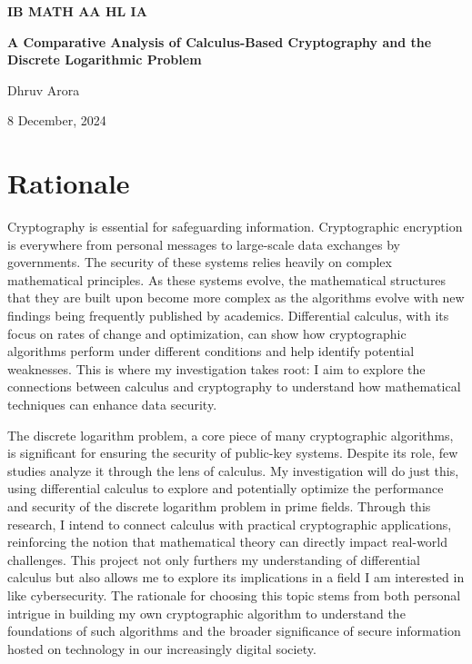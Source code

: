 \documentclass[12pt]{article}
\begin{document}
\begin{titlepage}
    \begin{center}
        \vspace*{1in}

        \textbf{IB MATH AA HL IA} \\

        \vspace{0.5in}

        \Large \textbf{A Comparative Analysis of Calculus-Based Cryptography and the Discrete Logarithmic Problem} \\

        \vspace{0.5in}

        \Large Dhruv Arora \\

        \vspace{0.25in}

        8 December, 2024

        \vspace{1.5in}
    \end{center}
\end{titlepage}

\newpage

\section{Rationale}
Cryptography is essential for safeguarding information. Cryptographic encryption is everywhere from personal messages to large-scale data exchanges by governments. The security of these systems relies heavily on complex mathematical principles. As these systems evolve, the mathematical structures that they are built upon become more complex as the algorithms evolve with new findings being frequently published by academics. Differential calculus, with its focus on rates of change and optimization, can show how cryptographic algorithms perform under different conditions and help identify potential weaknesses. This is where my investigation takes root: I aim to explore the connections between calculus and cryptography to understand how mathematical techniques can enhance data security.

The discrete logarithm problem, a core piece of many cryptographic algorithms, is significant for ensuring the security of public-key systems. Despite its role, few studies analyze it through the lens of calculus. My investigation will do just this, using differential calculus to explore and potentially optimize the performance and security of the discrete logarithm problem in prime fields. Through this research, I intend to connect calculus with practical cryptographic applications, reinforcing the notion that mathematical theory can directly impact real-world challenges. This project not only furthers my understanding of differential calculus but also allows me to explore its implications in a field I am interested in like cybersecurity. The rationale for choosing this topic stems from both personal intrigue in building my own cryptographic algorithm to understand the foundations of such algorithms and the broader significance of secure information hosted on technology in our increasingly digital society.
\end{document}
